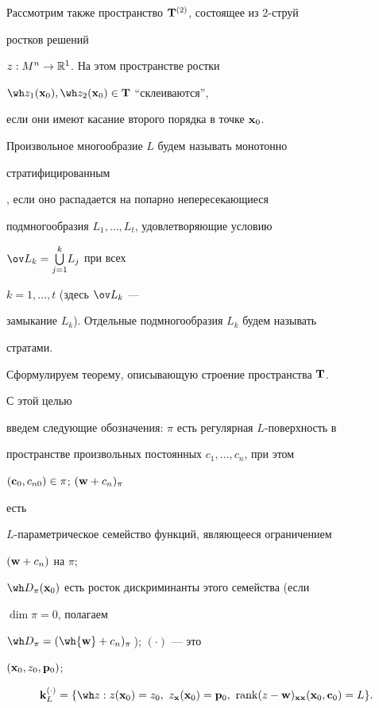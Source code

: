 Рассмотрим также пространство $\bold T^{(2)}$, состоящее из 2-струй


ростков решений


$z:M^n\to\Bbb R^1$. На этом пространстве ростки


$\wh z_1(\bold x_0),\wh z_2(\bold x_0)\in\bold T$ ``склеиваются'',


если они имеют касание второго порядка в точке $\bold x_0$.





Произвольное многообразие $L$ будем называть монотонно


стратифицированным


\cite{Z3}, если оно распадается на попарно непересекающиеся


подмногообразия $L_1,\dotsc,L_t$, удовлетворяющие условию


$\ov L_k=\overset{k}{\underset{j=1}{\bigcup}}{}L_j$ при всех


$k=1,\dotsc,t$ (здесь $\ov L_k$ ---


замыкание $L_k$). Отдельные подмногообразия $L_k$ будем называть


стратами.





Сформулируем теорему, описывающую строение пространства $\bold T$.


С этой целью


введем следующие обозначения: $\pi$ есть регулярная $L$-поверхность в


пространстве произвольных постоянных $c_1,\dotsc,c_n$, при этом


$(\bold c_0,c_{n0})\in\pi$; $(\bold w+c_n)_\pi$


есть


$L$-параметрическое семейство функций, являющееся ограничением


$(\bold w+c_n)$ на $\pi$;


$\wh D_\pi(\bold x_0)$ есть росток дискриминанты этого семейства (если


$\dim\pi=0$, полагаем


$\wh D_\pi=(\wh{\bold w}+c_n)_\pi$\,); $(\cdot)$ --- это


$(\bold x_0,z_0,\bold p_0)$;


\begin{equation}


\bold k^{(\cdot)}_L=\{\wh z:z(\bold x_0)=z_0, \


z_{\bold x}(\bold x_0)=\bold p_0, \


\rank(z-\bold w)_{\bold x\bold x}(\bold x_0,\bold c_0)=L\}.


\end{equation}





